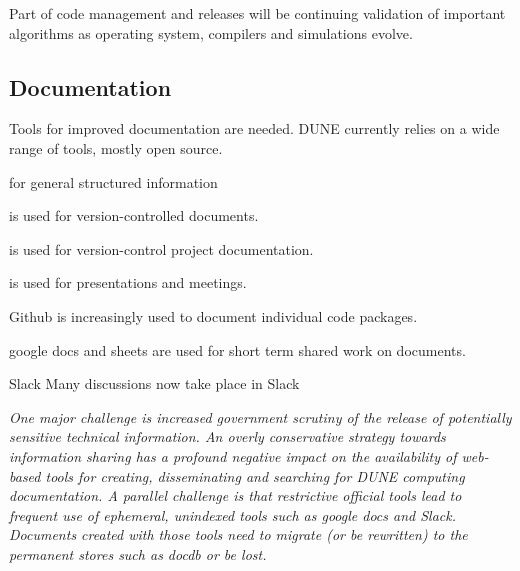 \documentclass[../main-v1.tex]{subfiles}
\begin{document}
Part of code management and releases will be continuing validation of important algorithms as operating system, compilers and simulations evolve. 



\subsection{Documentation}
Tools for improved documentation are needed. DUNE currently relies on a wide range of tools, mostly open source.

\begin{description}
\item[Mediawiki] for general structured information
\item[docdb]  is used for version-controlled documents. 
\item[edms]  is used for version-control project documentation.
\item[indico]  is used for presentations and meetings. 
\item[github] Github is increasingly used to document individual code packages.
\item[google tools] google docs and sheets are used for short term shared work on documents.
\item{Slack}  Many discussions now take place in Slack


\end{description}

{\it One major challenge is increased government  scrutiny of the release of potentially sensitive technical information.  An overly conservative strategy towards information sharing has a profound negative impact on the availability of web-based tools for creating, disseminating and searching for DUNE computing documentation. A parallel  challenge is that restrictive official tools lead to frequent use of ephemeral, unindexed tools such as google docs and Slack.  Documents created with those tools need to migrate (or be rewritten) to the permanent stores such as docdb or be lost.  } 


\end{document}
